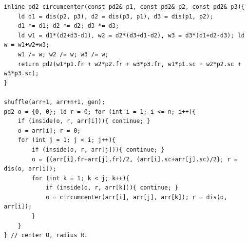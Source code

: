 \begin{verbatim}
inline pd2 circumcenter(const pd2& p1, const pd2& p2, const pd2& p3){
	ld d1 = dis(p2, p3), d2 = dis(p3, p1), d3 = dis(p1, p2);
	d1 *= d1; d2 *= d2; d3 *= d3;
	ld w1 = d1*(d2+d3-d1), w2 = d2*(d3+d1-d2), w3 = d3*(d1+d2-d3); ld w = w1+w2+w3;
	w1 /= w; w2 /= w; w3 /= w;
	return pd2(w1*p1.fr + w2*p2.fr + w3*p3.fr, w1*p1.sc + w2*p2.sc + w3*p3.sc);
}

shuffle(arr+1, arr+n+1, gen);
pd2 o = {0, 0}; ld r = 0; for (int i = 1; i <= n; i++){
	if (inside(o, r, arr[i])){ continue; }
	o = arr[i]; r = 0;
	for (int j = 1; j < i; j++){
		if (inside(o, r, arr[j])){ continue; }
		o = {(arr[i].fr+arr[j].fr)/2, (arr[i].sc+arr[j].sc)/2}; r = dis(o, arr[i]);
		for (int k = 1; k < j; k++){
			if (inside(o, r, arr[k])){ continue; }
			o = circumcenter(arr[i], arr[j], arr[k]); r = dis(o, arr[i]);
		}
	}
} // center O, radius R.
\end{verbatim}